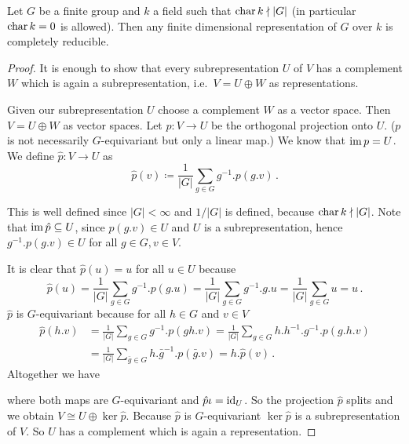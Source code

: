 \begin{thrm}
  Let $G$ be a finite group and $k$ a field such that $\operatorname{char} k \nmid |G|$ (in particular $\operatorname{char} k = 0$ is allowed). Then any finite dimensional representation of $G$ over $k$ is completely reducible.
\end{thrm}
\begin{proof}
  It is enough to show that every subrepresentation $U$ of $V$ has a complement $W$ which is again a subrepresentation, i.e.\ $V = U \oplus W$ as representations.
  
  Given our subrepresentation $U$ choose a complement $W$ as a vector space.
  Then $V = U \oplus W$ as vector spaces. Let $p \colon V \to U$ be the orthogonal projection onto $U$.
  ($p$ is not necessarily $G$-equivariant but only a linear map.)
  We know that $\operatorname{im} p = U$.
  We define $\hat{p} \colon V \to U$ as
  \[
              \hat{p}(v)
    \coloneqq \frac{1}{|G|} \sum_{g \in G} g^{-1}.p(g.v) \,.
  \]

  This is well defined since $|G| < \infty$ and $1/|G|$ is defined, because $\operatorname{char} k \nmid |G|$.
  Note that $\operatorname{im} \hat{p} \subseteq U$, since $p(g.v) \in U$ and $U$ is a subrepresentation, hence $g^{-1}.p(g.v) \in U$ for all $g \in G, v \in V$.

  It is clear that $\hat{p}(u) = u$ for all $u \in U$ because
  \[
      \hat{p}(u)
    = \frac{1}{|G|} \sum_{g \in G} g^{-1}.p(g.u)
    = \frac{1}{|G|} \sum_{g \in G} g^{-1}.g.u
    = \frac{1}{|G|} \sum_{g \in G} u
    = u \,.
  \]
  $\hat{p}$ is $G$-equivariant because for all $h \in G$ and $v \in V$
  \begin{align*}
        \hat{p}(h.v)
    &=  \frac{1}{|G|} \sum_{g \in G} g^{-1}.p(gh.v)
     =  \frac{1}{|G|} \sum_{g \in G} h.h^{-1}.g^{-1}.p(g.h.v) \\
    &=  \frac{1}{|G|} \sum_{\bar{g} \in G} h.\bar{g}^{-1}.p(\bar{g}.v)
     =  h.\hat{p}(v) \,.
  \end{align*}
  Altogether we have
  \begin{center}
  \end{center}
  where both maps are $G$-equivariant and $\hat{p} \iota = \operatorname{id}_U$.
  So the projection $\hat{p}$ splits and we obtain $V \cong U \oplus \ker \hat{p}$.
  Because $\hat{p}$ is $G$-equivariant $\ker \hat{p}$ is a subrepresentation of $V$.
  So $U$ has a complement which is again a representation.
\end{proof}

